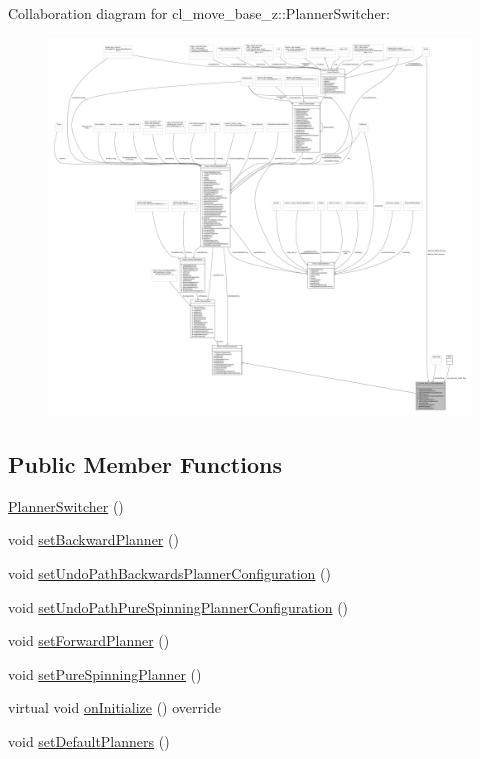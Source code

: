 Collaboration diagram for cl\+\_\+move\+\_\+base\+\_\+z\+:\+:Planner\+Switcher\+:
\nopagebreak
\begin{figure}[H]
\begin{center}
\leavevmode
\includegraphics[width=350pt]{classcl__move__base__z_1_1PlannerSwitcher__coll__graph}
\end{center}
\end{figure}
\subsection*{Public Member Functions}
\begin{DoxyCompactItemize}
\item 
\hyperlink{classcl__move__base__z_1_1PlannerSwitcher_aacdf8266ba7dc861efd460645587561f}{Planner\+Switcher} ()
\item 
void \hyperlink{classcl__move__base__z_1_1PlannerSwitcher_a6995deff44418a0965e4e793de8c4857}{set\+Backward\+Planner} ()
\item 
void \hyperlink{classcl__move__base__z_1_1PlannerSwitcher_a99e5ec5c0529dab7b528c1e0d9e36012}{set\+Undo\+Path\+Backwards\+Planner\+Configuration} ()
\item 
void \hyperlink{classcl__move__base__z_1_1PlannerSwitcher_a560f77f78b527ed9a0d4f598d98713a3}{set\+Undo\+Path\+Pure\+Spinning\+Planner\+Configuration} ()
\item 
void \hyperlink{classcl__move__base__z_1_1PlannerSwitcher_a4bec9859c90f125f9fcc2b68594caf17}{set\+Forward\+Planner} ()
\item 
void \hyperlink{classcl__move__base__z_1_1PlannerSwitcher_a0accdff89d7858658c1835f06b53786f}{set\+Pure\+Spinning\+Planner} ()
\item 
virtual void \hyperlink{classcl__move__base__z_1_1PlannerSwitcher_a36bc2b9788f03a1ca02b954c625ef4c5}{on\+Initialize} () override
\item 
void \hyperlink{classcl__move__base__z_1_1PlannerSwitcher_ad3f0d08a51af6218d203bf44a7f9df40}{set\+Default\+Planners} ()
\end{DoxyCompactItemize}
